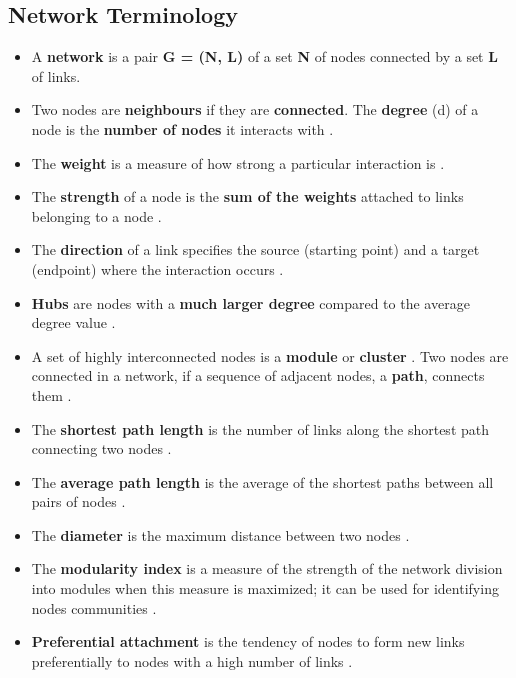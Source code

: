 \documentclass[
]{book}
\begin{document}
\hypertarget{network-terminology}{%
\subsection{Network Terminology}\label{network-terminology}}

\begin{itemize}
\item
  A \textbf{network} is a pair \textbf{G = (N, L)} of a set \textbf{N} of nodes connected by a set \textbf{L} of links.
\item
  Two nodes are \textbf{neighbours} if they are \textbf{connected}. The \textbf{degree} (d) of a node is the \textbf{number of nodes} it interacts with \citep{Bondy2008GraphTheory}.
\item
  The \textbf{weight} is a measure of how strong a particular interaction is \citep{Bondy2008GraphTheory}.
\item
  The \textbf{strength} of a node is the \textbf{sum of the weights} attached to links belonging to a node \citep{Barrat2003TheNetworks}.
\item
  The \textbf{direction} of a link specifies the source (starting point) and a target (endpoint) where the interaction occurs \citep{Barabasi2016} .
\item
  \textbf{Hubs} are nodes with a \textbf{much larger degree} compared to the average degree value \citep{Barrat2003TheNetworks}.
\item
  A set of highly interconnected nodes is a \textbf{module} or \textbf{cluster} \citep{Li2009}. Two nodes are connected in a network, if a sequence of adjacent nodes, a \textbf{path}, connects them \citep{barabasi2004network}.
\item
  The \textbf{shortest path length} is the number of links along the shortest path connecting two nodes \citep{barabasi2004network}.
\item
  The \textbf{average path length} is the average of the shortest paths between all pairs of nodes \citep{barabasi2004network}.
\item
  The \textbf{diameter} is the maximum distance between two nodes \citep{Bondy2008GraphTheory}.
\item
  The \textbf{modularity index} is a measure of the strength of the network division into modules when this measure is maximized; it can be used for identifying nodes communities \citep{Newman2018}.
\item
  \textbf{Preferential attachment} is the tendency of nodes to form new links preferentially to nodes with a high number of links \citep{barabasi1999emergence, Vazquez2003GrowingCorrelations}.

\end{itemize}
\end{document}
